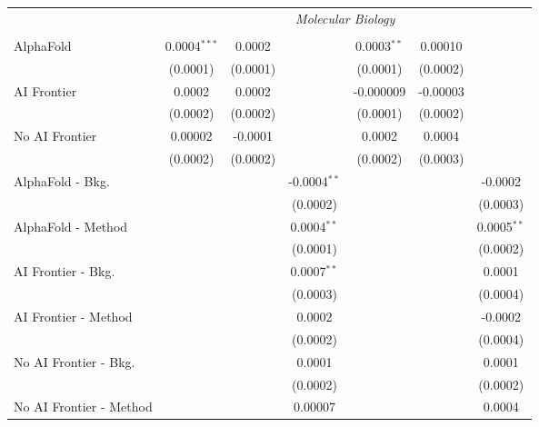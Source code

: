 \begin{tabular}{lcccccc}
 & \multicolumn{6}{c}{\textit{Molecular Biology}} \\ \\
   AlphaFold               & 0.0004$^{***}$ & 0.0002   &                & 0.0003$^{**}$ & 0.00010  &   \\   
                           & (0.0001)       & (0.0001) &                & (0.0001)      & (0.0002) &   \\   
   AI Frontier             & 0.0002         & 0.0002   &                & -0.000009     & -0.00003 &   \\   
                           & (0.0002)       & (0.0002) &                & (0.0001)      & (0.0002) &   \\   
   No AI Frontier          & 0.00002        & -0.0001  &                & 0.0002        & 0.0004   &   \\   
                           & (0.0002)       & (0.0002) &                & (0.0002)      & (0.0003) &   \\   
   AlphaFold - Bkg.        &                &          & -0.0004$^{**}$ &               &          & -0.0002\\   
                           &                &          & (0.0002)       &               &          & (0.0003)\\   
   AlphaFold - Method      &                &          & 0.0004$^{**}$  &               &          & 0.0005$^{**}$\\   
                           &                &          & (0.0001)       &               &          & (0.0002)\\   
   AI Frontier - Bkg.      &                &          & 0.0007$^{**}$  &               &          & 0.0001\\   
                           &                &          & (0.0003)       &               &          & (0.0004)\\   
   AI Frontier - Method    &                &          & 0.0002         &               &          & -0.0002\\   
                           &                &          & (0.0002)       &               &          & (0.0004)\\   
   No AI Frontier - Bkg.   &                &          & 0.0001         &               &          & 0.0001\\   
                           &                &          & (0.0002)       &               &          & (0.0002)\\   
   No AI Frontier - Method &                &          & 0.00007        &               &          & 0.0004\\   

\end{tabular}
